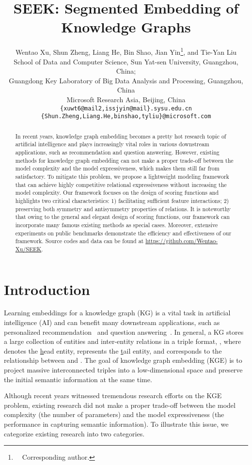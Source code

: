 \documentclass[11pt,a4paper]{article}
\title{SEEK: Segmented Embedding of Knowledge Graphs}
\author{Wentao  Xu, Shun Zheng, Liang He, Bin Shao, Jian Yin\thanks{\ \ Corresponding author.}, and Tie-Yan Liu\\
   School of Data and Computer Science, Sun Yat-sen University, Guangzhou, China;\\
  Guangdong Key Laboratory of Big Data Analysis and Processing, Guangzhou, China\\
   Microsoft Research Asia, Beijing, China \\
  \texttt{\{xuwt6@mail2,issjyin@mail\}.sysu.edu.cn} \\
  \texttt{\{Shun.Zheng,Liang.He,binshao,tyliu\}@microsoft.com} \\
}
\date{}
\begin{document}
\maketitle

\begin{abstract}
In recent years, knowledge graph embedding becomes a pretty hot research topic of artificial intelligence and plays increasingly vital roles in various downstream applications, such as recommendation and question answering.
However, existing methods for knowledge graph embedding can not make a proper trade-off between the model complexity and the model expressiveness, which makes them still far from satisfactory.
To mitigate this problem, we propose a lightweight modeling framework that can achieve highly competitive relational expressiveness without increasing the model complexity.
Our framework focuses on the design of scoring functions and highlights two critical characteristics:
1) facilitating sufficient feature interactions; 
2) preserving both symmetry and antisymmetry properties of relations.
It is noteworthy that owing to the general and elegant design of scoring functions, our framework can incorporate many famous existing methods as special cases.
Moreover, extensive experiments on public benchmarks demonstrate the efficiency and effectiveness of our framework.
Source codes and data can be found at \url{https://github.com/Wentao-Xu/SEEK}.
\end{abstract}
 \section{Introduction}
\label{sec:intro}

Learning embeddings for a knowledge graph (KG) is a vital task in artificial intelligence (AI) and can benefit many downstream applications, such as personalized recommendation~\cite{zhang2016collaborative,wang2018dkn} and question answering~\cite{huang2019knowledge}.
In general, a KG stores a large collection of entities and inter-entity relations in a triple format, , where  denotes the \underline{h}ead entity,  represents the \underline{t}ail entity, and  corresponds to the relationship between  and . 
The goal of knowledge graph embedding (KGE) is to project massive interconnected triples into a low-dimensional space and preserve the initial semantic information at the same time.

Although recent years witnessed tremendous research efforts on the KGE problem, existing research did not make a proper trade-off between the model complexity (the number of parameters) and the model expressiveness (the performance in capturing semantic information).
To illustrate this issue, we categorize existing research into two categories.
\end{document}
